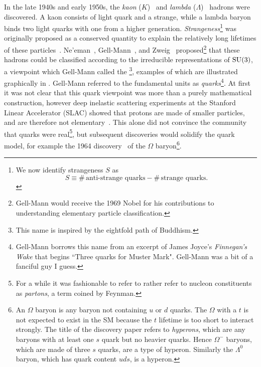 In the late 1940s and early 1950s, the {\it kaon} ($K$)~\cite{rochester_evidence_1947}
 and {\it lambda} ($\Lambda$)~\cite{hopper_evidence_1950}
 hadrons were discovered. A kaon
consists of light quark and a strange, while a lambda baryon binds two light
quarks with one from a higher generation. {\it Strangeness}\footnote{We now 
identify strangeness $S$ as
$$
  S\equiv\#\,\text{anti-strange quarks}-\#\,\text{strange quarks}.
$$}
was originally proposed as a conserved quantity to explain the relatively long
lifetimes of these particles~\cite{pais_remarks_1952,gell-mann_isotopic_1953,
pais_baryon-meson-photon_1953,tadao_charge_1953}.
Ne'eman~\cite{neeman_derivation_1961},
Gell-Mann~\cite{gell-mann_symmetries_1962}, and
Zweig~\cite{zweig_su3_1964} proposed\footnote{Gell-Mann would receive the 1969
Nobel for his contributions to understanding elementary particle
classification.} that these hadrons could be classified
according to the irreducible representations of $\operatorname{SU}(3)$, a viewpoint which
Gell-Mann called the \footnote{This
name is inspired by the eightfold path of Buddhism.}, examples of which are
illustrated graphically in . Gell-Mann
referred to the fundamental units as {\it quarks}\footnote{Gell-Mann borrows
this name from an excerpt of James Joyce's {\it Finnegan's Wake} that begins
``Three quarks for Muster Mark".
Gell-Mann was a bit of a fanciful guy I guess.}.
At first it was not clear that this quark viewpoint was more than a
purely mathematical construction, however deep inelastic
scattering
experiments at the Stanford Linear Accelerator (SLAC) showed that
protons are made of smaller particles, and are therefore not
elementary~\cite{bloom_high-energy_1969,breidenbach_observed_1969}.
This alone did not convince the community that quarks were 
real\footnote{For a while it was fashionable to refer to rather refer to
nucleon constituents as {\it partons}, a term coined
by Feynman.}, but
subsequent discoveries would solidify the quark model,
for example the 1964 discovery~\cite{barnes_observation_1964} 
of the 
$\Omega$ baryon\footnote{An $\Omega$ baryon is any baryon not
containing $u$ or $d$ quarks. The $\Omega$ with a $t$ is not expected
to exist in the SM because the $t$ lifetime is too short to
interact strongly. The title of the discovery paper refers 
to {\it hyperons}, which are any baryons with
at least one $s$ quark but no heavier quarks. 
Hence $\Omega^{-}$ baryons, which are made of three $s$ quarks,
are a type of hyperon. Similarly the $\Lambda^0$
baryon, which has quark content $uds$,
is a hyperon.}.

